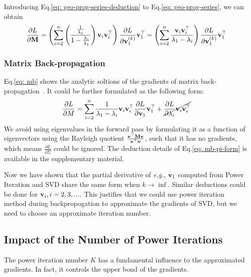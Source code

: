 	Introducing Eq.\ref{eq: geo-prog-series-deduction} to Eq.\ref{eq: geo-prog-series}, we can obtain	
	\begin{equation}
	\frac{\partial L}{\partial \mathbf{M}}
	=\left(\sum_{i=2}^{n}\left(
	\frac{\frac{1}{\lambda_{1}}}
	{1 - \frac{\lambda_{i}}{\lambda_{1}}}
	\right)
	\mathbf{v}_{i}\mathbf{v}_{i}^{\top}
	\right)\frac{\partial L}{\partial \mathbf{v}_{1}^{(k)}}\mathbf{v}_{1}^{\top}
	=\left(\sum_{i=2}^{n}
	\frac{\mathbf{v}_{i}\mathbf{v}_{i}^{\top}}
	{\lambda_{1} - \lambda_{i}}
	\right)\frac{\partial L}{\partial \mathbf{v}_{1}^{(k)}}\mathbf{v}_{1}^{\top}
	\label{eq: final-form}
	\end{equation}
	
	\subsubsection{Matrix Back-propagation}
	\label{sec: mbp}
	Eq.\ref{eq: mb} shows the analytic soltions of the gradients of matrix back-propagation~\cite{ionescu2015matrix}.
	It could be further formulated as the following form:
	\begin{equation}
	\frac{\partial L}{\partial M}
	=\sum_{i=2}^{n}\frac{1}{\lambda_{1}-\lambda_{i}}\mathbf{v}_{i}\mathbf{v}_{i}^{\top}\frac{\partial L}{\partial \mathbf{v}_{1}}\mathbf{v}_{1}^{\top}
	+ \cancel{\frac{\partial L}{\partial \lambda_i}\mathbf{v}_i\mathbf{v}_i^{\top}}
	\label{eq: mb-pi-form}
	\end{equation}
   We avoid using eigenvalues in the forward pass by formulating it as a function of eigenvectors using the Rayleigh quotient $\frac{\mathbf{v}^{\top} \mathbf{M} \mathbf{v}}{\mathbf{v}^{\top}  \mathbf{v}}$, such that it has no gradients, which means $\frac{\partial L}{\partial \Sigma}$ could be ignored. The deduction details of Eq.\ref{eq: mb-pi-form} is available in the supplementary material.

Now we have shown that the partial derivative of \emph{e.g.}, $\mathbf{v}_1$ computed from Power Iteration and SVD share the same form when $k\rightarrow \inf$.
Similar deductions could be done for  $\mathbf{v}_i, i=2,3,...$.
This justifies that we could use power iteration method during backpropogation to approximate the gradients of SVD, but we need to choose an approximate iteration number.

\subsection{Impact of the Number of Power Iterations}
\label{subsec: talyer-expansion}
The power iteration number $K$ has a fundamental influence to the approximated gradients. In fact, it controls the upper bond of the gradients.

